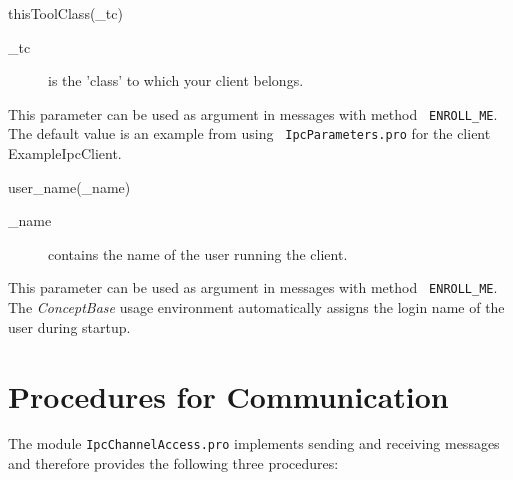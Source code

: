 \begin{method}{thisToolClass(\_tc)}
  \begin{description}
  \item[\_tc] is the 'class' to which your client belongs.
  \end{description}
This parameter can be used as argument in messages with method {\tt
  ENROLL\_ME}. The default value is an example from using {\tt
  IpcParameters.pro} for the client ExampleIpcClient.
\end{method}

\begin{method}{user\_name(\_name)}
  \begin{description}
  \item[\_name] contains the name of the user running the
    client.
  \end{description}
  This parameter can be used as argument in messages with method {\tt
    ENROLL\_ME}.  The {\it ConceptBase\/} usage environment
  automatically assigns the login name of the user during startup.
\end{method}


\section{Procedures for Communication}

The module {\tt IpcChannelAccess.pro} implements sending and receiving
messages and therefore provides the following three procedures:


